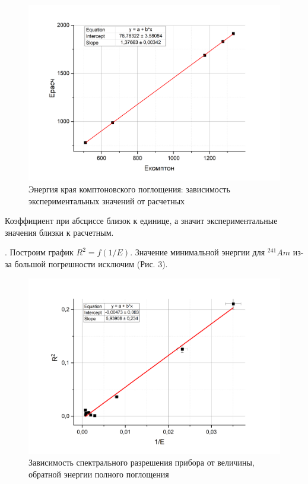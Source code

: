 \documentclass[a4paper,12pt]{article} %
\begin{document}
\begin{figure}[h!]
    \centering
    \includegraphics[scale=0.5]{комптон.png}
    \caption{Энергия края комптоновского поглощения: зависимость экспериментальных значений от расчетных}
    
\end{figure}

\medskip


\noindent  Коэффициент при абсциссе близок к единице, а значит экспериментальные значения близки к расчетным.

\medskip

. Построим график $R^2 = f(1/E)$. Значение минимальной энергии для $^{241}Am$ из-за большой погрешности исключим (Рис. 3).


\begin{figure}[h!]
    \centering
    \includegraphics[scale=0.5]{line.png}
    \caption{Зависимость спектрального разрешения прибора от величины, обратной энергии полного поглощения}
    
\end{figure}
\end{document}
